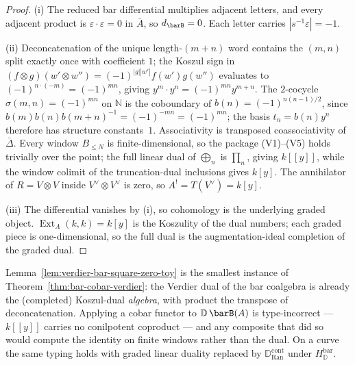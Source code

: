\begin{proof}
(i) The reduced bar differential multiplies adjacent letters, and
every adjacent product is $\varepsilon\cdot\varepsilon=0$ in $\bar A$,
so $d_{\barB}=0$. Each letter carries $|s^{-1}\varepsilon|=-1$.

(ii) Deconcatenation of the unique length-$(m{+}n)$ word contains the
$(m,n)$ split exactly once with coefficient $1$; the Koszul sign in
$(f\otimes g)(w'\otimes w'')=(-1)^{|g||w'|}f(w')g(w'')$ evaluates to
$(-1)^{n\cdot(-m)}=(-1)^{mn}$, giving
$y^{m}\cdot y^{n}=(-1)^{mn}y^{m+n}$. The $2$-cocycle
$\sigma(m,n)=(-1)^{mn}$ on $\mathbb N$ is the coboundary of
$b(n)=(-1)^{n(n-1)/2}$, since
$b(m)b(n)b(m+n)^{-1}=(-1)^{-mn}=(-1)^{mn}$; the basis $t_{n}=b(n)y^{n}$
therefore has structure constants~$1$. Associativity is transposed
coassociativity of $\bar\Delta$. Every window $B_{\leq N}$ is
finite-dimensional, so the package \textup{(V1)--(V5)} holds trivially
over the point; the full linear dual of $\bigoplus_{n}$ is
$\prod_{n}$, giving $k[[y]]$, while the window colimit of the
truncation-dual inclusions gives $k[y]$. The annihilator of
$R=V\otimes V$ inside $V^{\vee}\otimes V^{\vee}$ is zero, so
$A^{!}=T(V^{\vee})=k[y]$.

(iii) The differential vanishes by (i), so cohomology is the
underlying graded object. $\operatorname{Ext}_{A}(k,k)=k[y]$ is the
Koszulity of the dual numbers; each graded piece is one-dimensional,
so the full dual is the augmentation-ideal completion of the graded
dual.
\end{proof}

\begin{remark}
\label{rem:square-zero-toy-typing}
Lemma~\ref{lem:verdier-bar-square-zero-toy} is the smallest instance
of Theorem~\ref{thm:bar-cobar-verdier}: the Verdier dual of the bar
coalgebra is already the (completed) Koszul-dual \emph{algebra}, with
product the transpose of deconcatenation. Applying a cobar functor to
$\mathbb D\,\barB(A)$ is type-incorrect --- $k[[y]]$ carries no
conilpotent coproduct --- and any composite that did so would compute
the identity on finite windows rather than the dual. On a curve the
same typing holds with graded linear duality replaced by
$\mathbb D_{\operatorname{Ran}}^{\mathrm{cont}}$ under
$H_{\mathbb D}^{\mathrm{bar}}$.
\end{remark}

